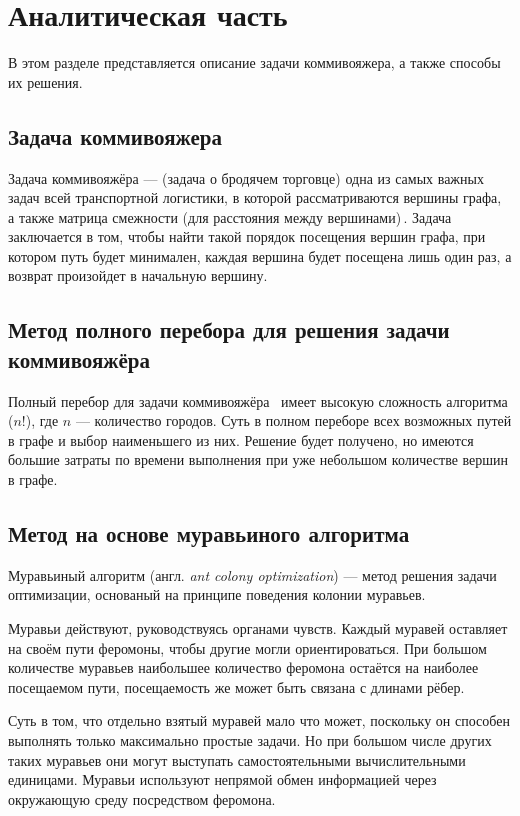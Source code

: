 \chapter{Аналитическая часть}

В этом разделе представляется описание задачи коммивояжера, а также способы их решения.


\section{Задача коммивояжера}

Задача коммивояжёра  --- (задача о бродячем торговце) одна из самых важных задач всей транспортной логистики, в которой рассматриваются вершины графа, а также матрица смежности (для расстояния между вершинами)\,\cite{task}. 
Задача заключается в том, чтобы найти такой порядок посещения вершин графа, при котором путь будет минимален, каждая вершина будет посещена лишь один раз, а возврат произойдет в начальную вершину. 



\section{Метод полного перебора для решения задачи коммивояжёра}

Полный перебор для задачи коммивояжёра~\cite{full-comb} имеет высокую сложность алгоритма ($n!$), где $n$ --- количество городов. 
Суть в полном переборе всех возможных путей в графе и выбор наименьшего из них. 
Решение будет получено, но имеются большие затраты по времени выполнения при уже небольшом количестве вершин в графе.

\section{Метод на основе муравьиного алгоритма}

Муравьиный алгоритм (англ. \textit{ant colony optimization}) \cite{full-comb} --- метод решения задачи оптимизации, основаный на принципе поведения колонии муравьев.

Муравьи действуют, руководствуясь органами чувств. 
Каждый муравей оставляет на своём пути феромоны, чтобы другие могли ориентироваться. 
При большом количестве муравьев наибольшее количество феромона остаётся на наиболее посещаемом пути, посещаемость же может быть связана с длинами рёбер.

Суть в том, что отдельно взятый муравей мало что может, поскольку он способен выполнять только максимально простые задачи. Но при большом числе других таких муравьев они могут выступать самостоятельными вычислительными единицами. Муравьи используют непрямой обмен информацией через окружающую среду посредством феромона.


